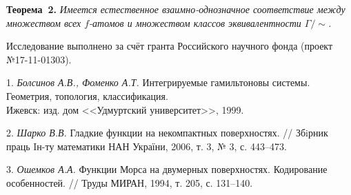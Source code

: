 \textbf{Теорема~2.} {\it Имеется естественное взаимно-однознач\-ное соответствие между множеством всех $f$-атомов и множеством классов эквивалентности $\mathfrak\Gamma/\sim$.}

Исследование выполнено за счёт гранта Российского научного фонда (проект №17-11-01303).

\litlist

1. {\it Болсинов А.В., Фоменко А.Т.} Интегрируемые гамильтоновы системы. Геометрия, топология, классификация.\\ Ижевск: изд. дом <<Удмуртский университет>>, 1999.

2. {\it Шарко В.В.} Гладкие функции на некомпактных поверхностях. // Збiрник праць Iн-ту математики НАН України, 2006, т. 3, № 3, с. 443--473.

3. {\it Ошемков А.А.} Функции Морса на двумерных поверхностях. Кодирование особенностей. // Труды МИРАН, 1994, т. 205, с. 131--140.

